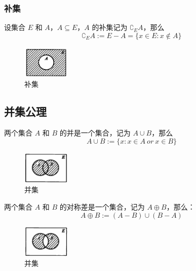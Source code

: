 \newpage
\subsubsection{补集}
\begin{definition}[补集]
    设集合 $ E $ 和 $ A $，$ A\subseteq E $，$ A $ 的补集记为 $ \complement_EA $，那么
    \[
        \complement_EA := E - A = \{x\in E:x\notin A\}
    \]
\end{definition}

\begin{figure}[htbp]
    \centering
    \includegraphics[width=0.2\textwidth]{figures/chapter1/chapter1_3} 
    \caption{补集}
    \label{fig:chapter1_3}
\end{figure}

\subsection{并集公理}
\begin{definition}[并集 Union]
    两个集合 $ A $ 和 $ B $ 的并是一个集合，记为 $ A \cup B $，那么
    \[
        A\cup B := \{x:x\in A\ or\ x\in B\} 
    \]
\end{definition}

\begin{figure}[htbp]
    \centering
    \includegraphics[width=0.2\textwidth]{figures/chapter1/chapter1_4} 
    \caption{并集}
    \label{fig:chapter1_4}
\end{figure}

\begin{definition}
    两个集合 $ A $ 和 $ B $ 的对称差是一个集合，记为 $ A \oplus  B $，那么：
    \[
        A\oplus  B := (A-B) \cup (B-A) 
    \]
\end{definition}

\begin{figure}[htbp]
    \centering
    \includegraphics[width=0.2\textwidth]{figures/chapter1/chapter1_5} 
    \caption{并集}
    \label{fig:chapter1_5}
\end{figure}

